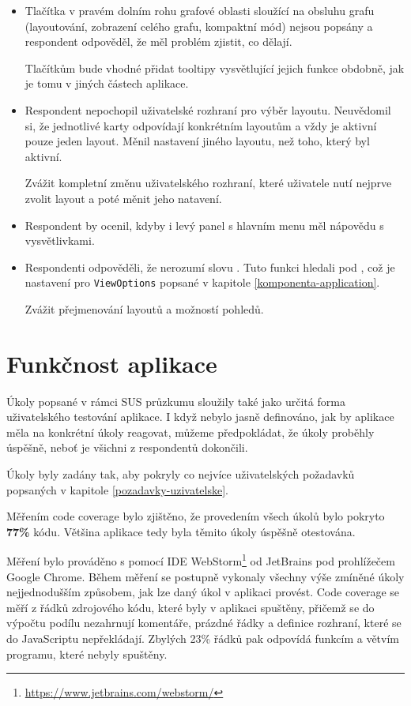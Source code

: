 \begin{itemize}
    \item Tlačítka v pravém dolním rohu grafové oblasti sloužící na obsluhu grafu (layoutování, zobrazení celého grafu, kompaktní mód) nejsou popsány a respondent odpověděl, že měl problém zjistit, co dělají.

    Tlačítkům bude vhodné přidat tooltipy vysvětlující jejich funkce obdobně, jak je tomu v jiných částech aplikace.
    \item Respondent nepochopil uživatelské rozhraní pro výběr layoutu. Neuvědomil si, že jednotlivé karty odpovídají konkrétním layoutům a vždy je aktivní pouze jeden layout. Měnil nastavení jiného layoutu, než toho, který byl aktivní.

    Zvážit kompletní změnu uživatelského rozhraní, které uživatele nutí nejprve zvolit layout a poté měnit jeho natavení.
    \item Respondent by ocenil, kdyby i levý panel s hlavním menu měl nápovědu s vysvětlivkami.
    \item Respondenti odpověděli, že nerozumí slovu . Tuto funkci hledali pod , což je nastavení pro \texttt{ViewOptions} popsané v kapitole \ref{komponenta-application}.

    Zvážit přejmenování layoutů a možností pohledů.
\end{itemize}

\newpage

\section{Funkčnost aplikace}

Úkoly popsané v rámci SUS průzkumu sloužily také jako určitá forma uživatelského testování aplikace. I když nebylo jasně definováno, jak by aplikace měla na konkrétní úkoly reagovat, můžeme předpokládat, že úkoly proběhly úspěšně, neboť je všichni z respondentů dokončili.

Úkoly byly zadány tak, aby pokryly co nejvíce uživatelských požadavků popsaných v kapitole \ref{pozadavky-uzivatelske}.

\bigskip

Měřením code coverage bylo zjištěno, že provedením všech úkolů bylo pokryto \textbf{77\%} kódu. Většina aplikace tedy byla těmito úkoly úspěšně otestována.

Měření bylo prováděno s pomocí IDE WebStorm\footnote{\url{https://www.jetbrains.com/webstorm/}} od JetBrains pod prohlížečem Google Chrome. Během měření se postupně vykonaly všechny výše zmíněné úkoly nejjednodušším způsobem, jak lze daný úkol v aplikaci provést. Code coverage se měří z řádků zdrojového kódu, které byly v aplikaci spuštěny, přičemž se do výpočtu podílu nezahrnují komentáře, prázdné řádky a definice rozhraní, které se do JavaScriptu nepřekládají. Zbylých 23\% řádků pak odpovídá funkcím a větvím programu, které nebyly spuštěny.
